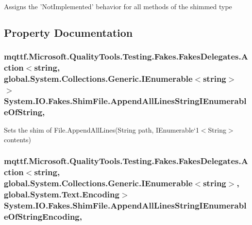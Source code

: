 Assigns the 'Not\-Implemented' behavior for all methods of the shimmed type



\subsection{Property Documentation}
\hypertarget{class_system_1_1_i_o_1_1_fakes_1_1_shim_file_abd381edc3715b0d0774ee955c8fccb3e}{
\subsubsection[{Append\-All\-Lines\-String\-I\-Enumerable\-Of\-String}]{\setlength{\rightskip}{0pt plus 5cm}mqttf.\-Microsoft.\-Quality\-Tools.\-Testing.\-Fakes.\-Fakes\-Delegates.\-Action$<$string, global.\-System.\-Collections.\-Generic.\-I\-Enumerable$<$string$>$ $>$ System.\-I\-O.\-Fakes.\-Shim\-File.\-Append\-All\-Lines\-String\-I\-Enumerable\-Of\-String\hspace{0.3cm}{\ttfamily [static]}, {\ttfamily [set]}}}\label{class_system_1_1_i_o_1_1_fakes_1_1_shim_file_abd381edc3715b0d0774ee955c8fccb3e}


Sets the shim of File.\-Append\-All\-Lines(String path, I\-Enumerable`1$<$String$>$ contents)

\hypertarget{class_system_1_1_i_o_1_1_fakes_1_1_shim_file_a692ed8991f0aedf0c2980874d773be9b}{
\subsubsection[{Append\-All\-Lines\-String\-I\-Enumerable\-Of\-String\-Encoding}]{\setlength{\rightskip}{0pt plus 5cm}mqttf.\-Microsoft.\-Quality\-Tools.\-Testing.\-Fakes.\-Fakes\-Delegates.\-Action$<$string, global.\-System.\-Collections.\-Generic.\-I\-Enumerable$<$string$>$, global.\-System.\-Text.\-Encoding$>$ System.\-I\-O.\-Fakes.\-Shim\-File.\-Append\-All\-Lines\-String\-I\-Enumerable\-Of\-String\-Encoding\hspace{0.3cm}{\ttfamily [static]}, {\ttfamily [set]}}}\label{class_system_1_1_i_o_1_1_fakes_1_1_shim_file_a692ed8991f0aedf0c2980874d773be9b}



